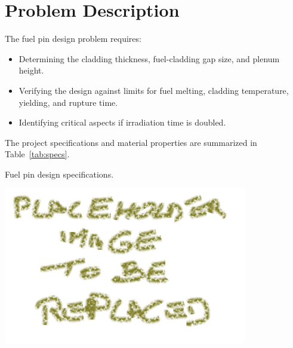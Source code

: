 
\section{Problem Description}
The fuel pin design problem requires:

\begin{itemize}
\item Determining the cladding thickness, fuel-cladding gap size, and plenum height.
\item Verifying the design against limits for fuel melting, cladding temperature, yielding, and rupture time.
\item Identifying critical aspects if irradiation time is doubled.
\end{itemize}

The project specifications and material properties are summarized in Table~\ref{tab:specs}.

\begin{table}[H]
\centering
\caption{Fuel pin design specifications.}
\label{tab:specs}
\includegraphics[width=0.8\textwidth]{placeholder.png}
\end{table}
